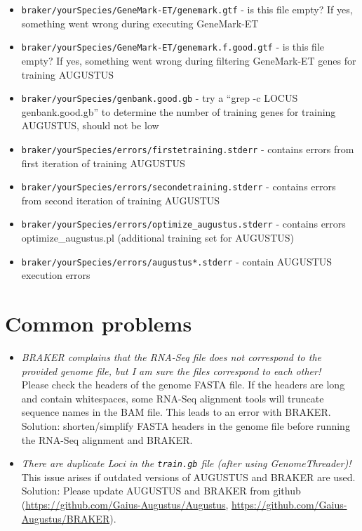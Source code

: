 \documentclass[a4paper,10pt]{report}
\begin{document}
\begin{itemize}
 \item  \texttt{braker/yourSpecies/GeneMark-ET/genemark.gtf} - is this file empty? If yes, something went wrong 
                                                 during executing GeneMark-ET

 \item  \texttt{braker/yourSpecies/GeneMark-ET/genemark.f.good.gtf} - is this file empty? If yes, something went
                                                        wrong during filtering GeneMark-ET genes 
                                                        for training AUGUSTUS
 
 \item  \texttt{braker/yourSpecies/genbank.good.gb} - try a ``grep -c LOCUS genbank.good.gb'' to determine the 
                                        number of training genes for training AUGUSTUS, should not
                                        be low

 \item  \texttt{braker/yourSpecies/errors/firstetraining.stderr} - contains errors from first iteration of 
                                                     training AUGUSTUS
 \item  \texttt{braker/yourSpecies/errors/secondetraining.stderr} - contains errors from second iteration of
                                                      training AUGUSTUS
   \item \texttt{braker/yourSpecies/errors/optimize\_augustus.stderr} - contains errors optimize\_augustus.pl 
                                                        (additional training set for AUGUSTUS)

 \item  \texttt{braker/yourSpecies/errors/augustus*.stderr} - contain AUGUSTUS execution errors

\end{itemize}

\section{Common problems}\label{commonproblems}

\begin{itemize}
	\item \textit{BRAKER complains that the RNA-Seq file does not correspond to the provided genome file, but I am sure the files correspond to each other!}\\
	Please check the headers of the genome FASTA file. If the headers are long and contain whitespaces, some RNA-Seq alignment tools will truncate sequence names in the BAM file. This leads to an error with BRAKER. Solution: shorten/simplify FASTA headers in the genome file before running the RNA-Seq alignment and BRAKER.
	\item \textit{There are duplicate Loci in the \texttt{train.gb} file (after using GenomeThreader)!}\\ This issue arises if outdated versions of AUGUSTUS and BRAKER are used. Solution: Please update AUGUSTUS and BRAKER from github (\url{https://github.com/Gaius-Augustus/Augustus}, \url{https://github.com/Gaius-Augustus/BRAKER}).
\end{itemize}
\end{document}
